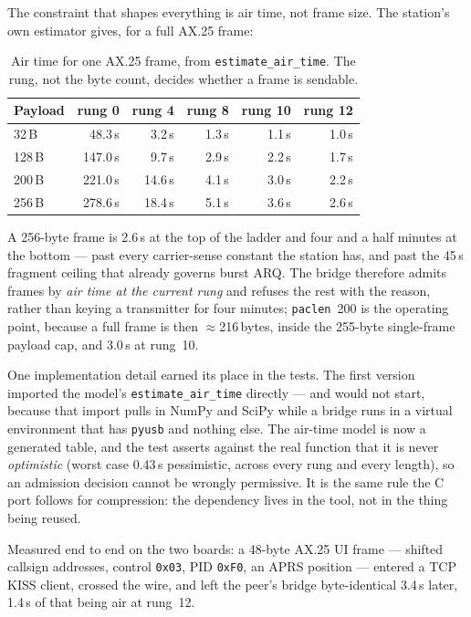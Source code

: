 The constraint that shapes everything is air time, not frame size.  The
station's own estimator gives, for a full AX.25 frame:

\begin{table}[H]
    \centering
    \caption{Air time for one AX.25 frame, from
             \texttt{estimate\_air\_time}.  The rung, not the byte
             count, decides whether a frame is sendable.}
    \label{tab:kiss_air}
    \small
    \begin{tabular}{@{}lrrrrr@{}}
    \toprule
    \textbf{Payload} & \textbf{rung 0} & \textbf{rung 4} &
    \textbf{rung 8} & \textbf{rung 10} & \textbf{rung 12} \\
    \midrule
    32\,B  & 48.3\,s  & 3.2\,s  & 1.3\,s & 1.1\,s & 1.0\,s \\
    128\,B & 147.0\,s & 9.7\,s  & 2.9\,s & 2.2\,s & 1.7\,s \\
    200\,B & 221.0\,s & 14.6\,s & 4.1\,s & 3.0\,s & 2.2\,s \\
    256\,B & 278.6\,s & 18.4\,s & 5.1\,s & 3.6\,s & 2.6\,s \\
    \bottomrule
    \end{tabular}
\end{table}

A 256-byte frame is 2.6\,s at the top of the ladder and four and a half
minutes at the bottom --- past every carrier-sense constant the station
has, and past the 45\,s fragment ceiling that already governs burst
ARQ.  The bridge therefore admits frames by \emph{air time at the
current rung} and refuses the rest with the reason, rather than keying
a transmitter for four minutes; \texttt{paclen}~200 is the operating
point, because a full frame is then $\approx$216\,bytes, inside the
255-byte single-frame payload cap, and 3.0\,s at rung~10.

One implementation detail earned its place in the tests.  The first
version imported the model's \texttt{estimate\_air\_time} directly ---
and would not start, because that import pulls in NumPy and SciPy while
a bridge runs in a virtual environment that has \texttt{pyusb} and
nothing else.  The air-time model is now a generated table, and the
test asserts against the real function that it is never
\emph{optimistic} (worst case 0.43\,s pessimistic, across every rung
and every length), so an admission decision cannot be wrongly
permissive.  It is the same rule the C port follows for compression:
the dependency lives in the tool, not in the thing being reused.

Measured end to end on the two boards: a 48-byte AX.25 UI frame ---
shifted callsign addresses, control \texttt{0x03}, PID \texttt{0xF0},
an APRS position --- entered a TCP KISS client, crossed the wire, and
left the peer's bridge byte-identical 3.4\,s later, 1.4\,s of that
being air at rung~12.

